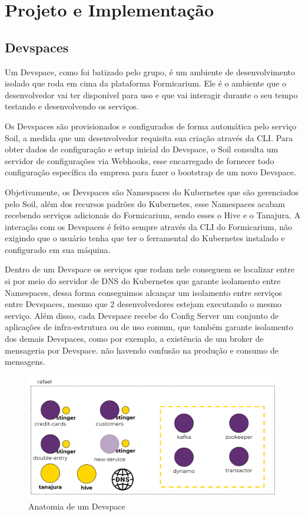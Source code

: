 \chapter{Projeto e Implementação}
    \section{Devspaces}
    
    Um Devspace, como foi batizado pelo grupo, é um ambiente de desenvolvimento isolado que roda em cima da plataforma Formicarium. Ele é o ambiente que o desenvolvedor vai ter disponível para uso e que vai interagir durante o seu tempo testando e desenvolvendo os serviços. 
    
    Os Devspaces são provisionados e configurados de forma automática pelo serviço Soil, a medida que um desenvolvedor requisita sua criação através da CLI. Para obter dados de configuração e setup inicial do Devspace, o Soil consulta um servidor de configurações via Webhooks, esse encarregado de fornecer todo configuração específica da empresa para fazer o bootstrap de um novo Devspace.
    
    Objetivamente, os Devspaces são Namespaces do Kubernetes que são gerenciados pelo Soil, além dos recursos padrões do Kubernetes, esse Namespaces acabam recebendo serviços adicionais do Formicarium, sendo esses o Hive e o Tanajura. A interação com os Devspaces é feito sempre através da CLI do Formicarium, não exigindo que o usuário tenha que ter o ferramental do Kubernetes instalado e configurado em sua máquina.
    
    Dentro de um Devspace os serviços que rodam nele conseguem se localizar entre si por meio do servidor de DNS do Kubernetes que garante isolamento entre Namespaces, dessa forma conseguimos alcançar um isolamento entre serviços entre Devspaces, mesmo que 2 desenvolvedores estejam executando o mesmo serviço. Além disso, cada Devspace recebe do Config Server um conjunto de aplicações de infra-estrutura ou de uso comum, que também garante isolamento dos demais Devspaces, como por exemplo, a existência de um broker de mensageria por Devspace. não havendo confusão na produção e consumo de mensagens.
    
        \begin{figure}[htbp]
			\caption{\label{fig_devspace1}Anatomia de um Devspace}
			\begin{center}
			\includegraphics[scale=0.30]{pictures/devspace1.png}
			\end{center}
		\end{figure}
    

